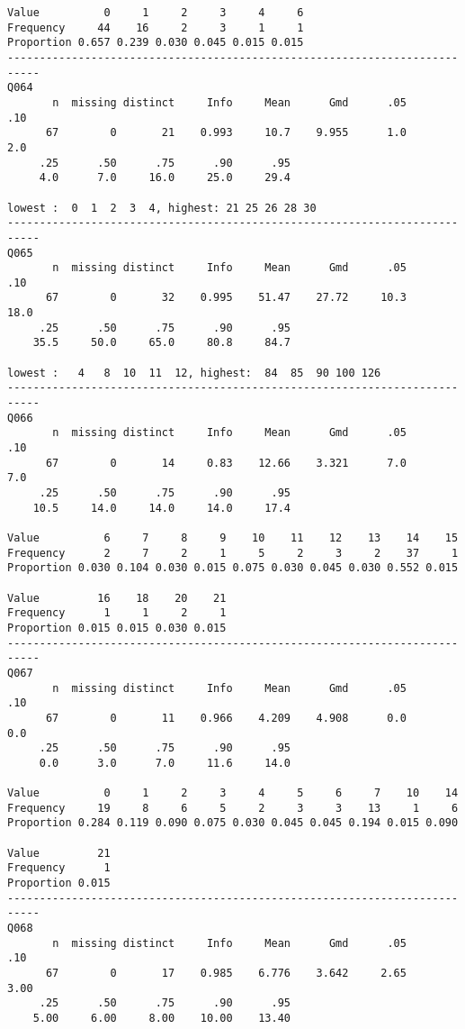 \documentclass[]{article}
\begin{document}
\begin{verbatim}
Value          0     1     2     3     4     6
Frequency     44    16     2     3     1     1
Proportion 0.657 0.239 0.030 0.045 0.015 0.015
---------------------------------------------------------------------------
Q064 
       n  missing distinct     Info     Mean      Gmd      .05      .10 
      67        0       21    0.993     10.7    9.955      1.0      2.0 
     .25      .50      .75      .90      .95 
     4.0      7.0     16.0     25.0     29.4 

lowest :  0  1  2  3  4, highest: 21 25 26 28 30
---------------------------------------------------------------------------
Q065 
       n  missing distinct     Info     Mean      Gmd      .05      .10 
      67        0       32    0.995    51.47    27.72     10.3     18.0 
     .25      .50      .75      .90      .95 
    35.5     50.0     65.0     80.8     84.7 

lowest :   4   8  10  11  12, highest:  84  85  90 100 126
---------------------------------------------------------------------------
Q066 
       n  missing distinct     Info     Mean      Gmd      .05      .10 
      67        0       14     0.83    12.66    3.321      7.0      7.0 
     .25      .50      .75      .90      .95 
    10.5     14.0     14.0     14.0     17.4 
                                                                      
Value          6     7     8     9    10    11    12    13    14    15
Frequency      2     7     2     1     5     2     3     2    37     1
Proportion 0.030 0.104 0.030 0.015 0.075 0.030 0.045 0.030 0.552 0.015
                                  
Value         16    18    20    21
Frequency      1     1     2     1
Proportion 0.015 0.015 0.030 0.015
---------------------------------------------------------------------------
Q067 
       n  missing distinct     Info     Mean      Gmd      .05      .10 
      67        0       11    0.966    4.209    4.908      0.0      0.0 
     .25      .50      .75      .90      .95 
     0.0      3.0      7.0     11.6     14.0 
                                                                      
Value          0     1     2     3     4     5     6     7    10    14
Frequency     19     8     6     5     2     3     3    13     1     6
Proportion 0.284 0.119 0.090 0.075 0.030 0.045 0.045 0.194 0.015 0.090
                
Value         21
Frequency      1
Proportion 0.015
---------------------------------------------------------------------------
Q068 
       n  missing distinct     Info     Mean      Gmd      .05      .10 
      67        0       17    0.985    6.776    3.642     2.65     3.00 
     .25      .50      .75      .90      .95 
    5.00     6.00     8.00    10.00    13.40 
                                                                      

\end{verbatim}
\end{document}
